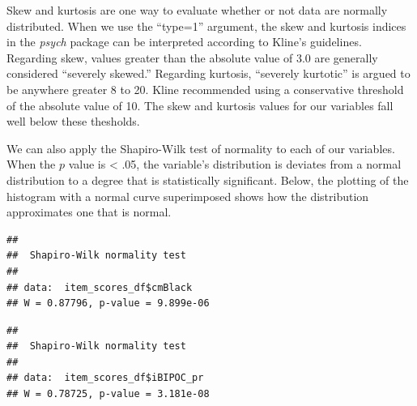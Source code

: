 \documentclass[
  11pt,
]{book}
\newenvironment{Shaded}{\begin{snugshade}}{\end{snugshade}}
\newcommand{\CommentTok}[1]{\textcolor[rgb]{0.37,0.37,0.37}{\textit{#1}}}
\newcommand{\FunctionTok}[1]{\textcolor[rgb]{0.27,0.27,0.27}{\textbf{#1}}}
\newcommand{\NormalTok}[1]{#1}
\newcommand{\SpecialCharTok}[1]{\textcolor[rgb]{0.43,0.43,0.43}{\textbf{#1}}}
\begin{document}
Skew and kurtosis are one way to evaluate whether or not data are normally distributed. When we use the ``type=1'' argument, the skew and kurtosis indices in the \emph{psych} package can be interpreted according to Kline's \citeyearpar{kline_data_2016} guidelines. Regarding skew, values greater than the absolute value of 3.0 are generally considered ``severely skewed.'' Regarding kurtosis, ``severely kurtotic'' is argued to be anywhere greater 8 to 20. Kline recommended using a conservative threshold of the absolute value of 10. The skew and kurtosis values for our variables fall well below these thesholds.

We can also apply the Shapiro-Wilk test of normality to each of our variables. When the \(p\) value is \textless{} .05, the variable's distribution is deviates from a normal distribution to a degree that is statistically significant. Below, the plotting of the histogram with a normal curve superimposed shows how the distribution approximates one that is normal.

\begin{Shaded}
\end{Shaded}

\begin{verbatim}
## 
##  Shapiro-Wilk normality test
## 
## data:  item_scores_df$cmBlack
## W = 0.87796, p-value = 9.899e-06
\end{verbatim}

\begin{Shaded}
\end{Shaded}

\begin{verbatim}
## 
##  Shapiro-Wilk normality test
## 
## data:  item_scores_df$iBIPOC_pr
## W = 0.78725, p-value = 3.181e-08
\end{verbatim}

\begin{Shaded}
\end{Shaded}
\end{document}
